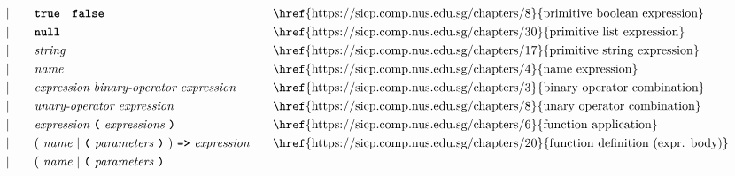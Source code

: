 \begin{alignat*}{9}
&&                       && |   &\quad && \textbf{\texttt{true}}\ |\ \textbf{\texttt{false}}
                                                           && \textrm{\href{https://sicp.comp.nus.edu.sg/chapters/8}{primitive boolean expression}}\\
&&                       && |   &\quad && \textbf{\texttt{null}}
                                                           && \textrm{\href{https://sicp.comp.nus.edu.sg/chapters/30}{primitive list expression}} \\
&&                       && |   &\quad &&  \textit{string}   && \textrm{\href{https://sicp.comp.nus.edu.sg/chapters/17}{primitive string expression}} \\
&&                       && |   &\quad &&  \textit{name}   && \textrm{\href{https://sicp.comp.nus.edu.sg/chapters/4}{name expression}} \\
&&                       && |   &\quad &&  \textit{expression} \  \textit{binary-operator} \ 
                                            \textit{expression} \qquad
                                                           && \textrm{\href{https://sicp.comp.nus.edu.sg/chapters/3}{binary operator combination}} \\
&&                       && |   &\quad &&   \textit{unary-operator} \ 
                                            \textit{expression}
                                                           && \textrm{\href{https://sicp.comp.nus.edu.sg/chapters/8}{unary operator combination}}\\
&&                       && |   &\quad &&   \textit{expression} \ 
                                            \textbf{\texttt{(}}\ \textit{expressions}\
                                            \textbf{\texttt{)}}
                                                           && \textrm{\href{https://sicp.comp.nus.edu.sg/chapters/6}{function application}} \\
&&                       && |   &\quad &&   (\ \textit{name}\ | \
                                               \textbf{\texttt{(}}\ \textit{parameters}\ \textbf{\texttt{)}}\
                                            )\    
                                            \texttt{\textbf{=>}}\ \textit{expression}
                                                           && \textrm{\href{https://sicp.comp.nus.edu.sg/chapters/20}{function definition (expr. body)}} \\
&&                       && |   &\quad &&   (\ \textit{name}\ | \
                                               \textbf{\texttt{(}}\ \textit{parameters}\ \textbf{\texttt{)}}\

\end{alignat*}
